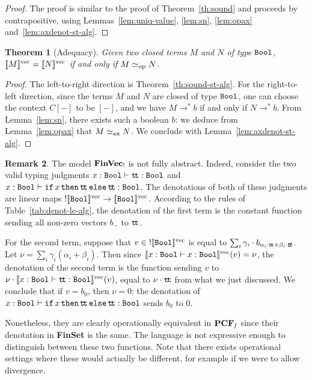 \documentclass[10pt]{article}
\theoremstyle{plain}
\newtheorem{theorem}{Theorem}
\theoremstyle{definition}
\newtheorem{remark}[theorem]{Remark}
\newcommand{\entail}{\vdash}
\newcommand{\FinSet}{\mbox{\bf FinSet}}
\newcommand{\FinVec}{\mbox{\bf FinVec}}
\newcommand{\ttrue}{{\tt t}\!{\tt t}}
\newcommand{\ffalse}{{\tt f}\!{\tt f}}
\newcommand{\ifterm}[3]{{{\tt if}\,{#1}\,{\tt then}\,{#2}\,{\tt else}\,{#3}}}
\newcommand{\bit}{{\tt Bool}}
\newcommand{\opeq}{\mathrel{\simeq_{\rm op}}}
\newcommand{\axeq}{\mathrel{\simeq_{\rm ax}}}
\newcommand{\fvdenot}[1]{{[\![{#1}]\!]^{\rm vec}}}
\begin{document}
\begin{proof}
  The proof is similar to the proof of Theorem~\ref{th:sound} and
  proceeds by contrapositive, using Lemmas~\ref{lem:uniq-value},
  \ref{lem:sn}, \ref{lem:opax} and~\ref{lem:axdenot-st-alg}.
\end{proof}

\begin{theorem}[Adequacy]
  Given two closed terms $M$ and $N$ of type $\bit$, $\fvdenot{M}=\fvdenot{N}$ if and
  only if $M\opeq N$.
\end{theorem}

\begin{proof}
  The left-to-right direction is Theorem~\ref{th:sound-st-alg}. For
  the right-to-left direction, since the terms $M$ and $N$ are closed
  of type $\bit$, one can choose the context $C[-]$ to be $[-]$, and
  we have $M\to^* b$ if and only if $N\to^* b$. From
  Lemma~\ref{lem:sn}, there exists such a boolean $b$: we deduce from
  Lemma~\ref{lem:opax} that $M\axeq N$. We conclude with
  Lemma~\ref{lem:axdenot-st-alg}.
\end{proof}

\begin{remark}
\label{rem:notfullyabst}
The model ${\FinVec}_!$ is not fully abstract. 
Indeed, consider the two valid typing judgments
$
x:\bit\entail\ttrue:\bit
$
and
$
x:\bit\entail\ifterm{x}{\ttrue}{\ttrue}:\bit
$.
The denotations of both of these judgments are linear maps 
$!\fvdenot{\bit}\to\fvdenot{\bit}$. According to the rules of
Table~\ref{tab:denot-lc-alg}, the denotation of the first term is 
the constant function sending all non-zero
vectors $b_{-}$ to $\ttrue$.

For the second term,
suppose that $v\in{!\fvdenot{\bit}}$ is 
equal to
$\sum_i\gamma_i\cdot{}b_{\alpha_i\cdot\ttrue + \beta_i\cdot\ffalse}$.
Let $\nu = \sum_i\gamma_i(\alpha_i + \beta_i)$.
Then since $\fvdenot{x:\bit\entail x:\bit}(v) = \nu$, 
the denotation of the second term is the function sending $v$
to $\nu\cdot\fvdenot{x:\bit\entail\ttrue:\bit}(v)$, equal to
$\nu\cdot\ttrue$ from what we just discussed.
We conclude that if $v=b_0$, then $\nu=0$: the denotation of
$x:\bit\entail\ifterm{x}{\ttrue}{\ttrue}:\bit$ sends $b_0$ to $0$.

Nonetheless, they are clearly operationally equivalent in ${\bf
  PCF}_{\it f}$ since their denotation in {\FinSet} is the same.
The language is not expressive enough to distinguish between these two
functions. Note that there exists operational settings where these
would actually be different, for example if we were to allow divergence.
\end{remark}
\end{document}
